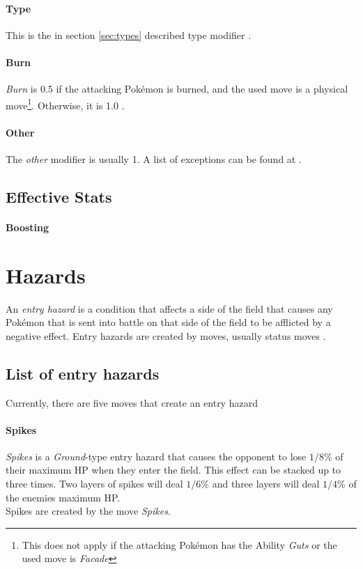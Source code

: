 \paragraph{Type}
This is the in section \ref{sec:types} described type modifier \cite{Bulbapedia:Damage}.

\paragraph{Burn}
\textit{Burn} is 0.5 if the attacking Pokémon is burned, and the used move
is a physical move\footnote{This does not apply if the attacking Pokémon has the Ability \textit{Guts}
or the used move is \textit{Facade}}. Otherwise, it is 1.0 \cite{Bulbapedia:Damage}.

\paragraph{Other}
The \textit{other} modifier is usually 1. A list of exceptions can be found at \cite{Bulbapedia:Damage}.

\subsection{Effective Stats}
\paragraph{Boosting}
\label{sec:boosting}

\section{Hazards}
\label{sec:hazards}
An \textit{entry hazard} is a condition that affects a side of the field that causes
any Pokémon that is sent into battle on that side of the field to be afflicted by 
a negative effect. Entry hazards are created by moves, usually status moves
\cite{Bulbapedia:EntryHazards}. \\
\subsection{List of entry hazards}
Currently, there are five moves that create an entry hazard

\paragraph{Spikes}
\textit{Spikes} is a \textit{Ground}-type entry hazard that causes the opponent
to lose $1/8$\% of their maximum \ac{HP} when they enter the field. This
effect can be stacked up to three times. Two layers of spikes will deal
$1/6$\% and three layers will deal $1/4$\% of the enemies maximum \ac{HP}. \\
Spikes are created by the move \textit{Spikes}\cite{Bulbapedia:Spikes}.

